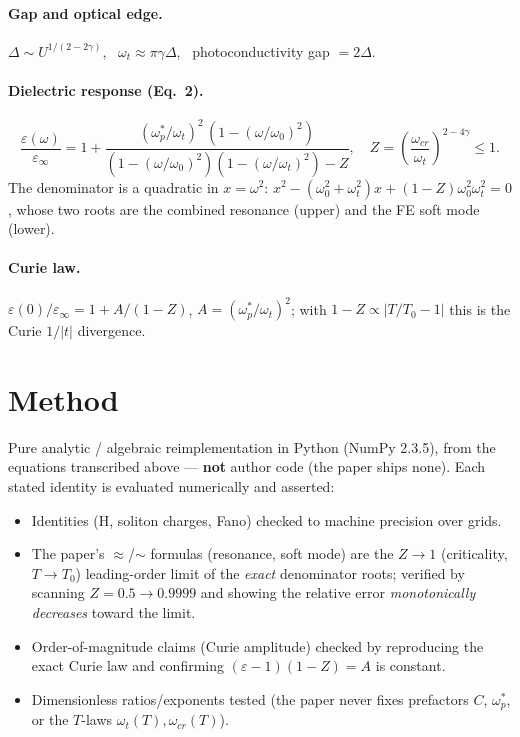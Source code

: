 \documentclass[11pt]{article}
\begin{document}
\paragraph{Gap and optical edge.}
$\Delta\sim U^{1/(2-2\gamma)}$, \ $\omega_t\approx\pi\gamma\Delta$, \ photoconductivity gap $=2\Delta$.
\paragraph{Dielectric response (Eq.~2).}
\begin{equation}
\frac{\varepsilon(\omega)}{\varepsilon_\infty}=1+
\frac{(\omega_p^*/\omega_t)^2\,(1-(\omega/\omega_0)^2)}
{(1-(\omega/\omega_0)^2)(1-(\omega/\omega_t)^2)-Z},\quad
Z=\left(\frac{\omega_{cr}}{\omega_t}\right)^{2-4\gamma}\le1 .
\end{equation}
The denominator is a quadratic in $x=\omega^2$:
$x^2-(\omega_0^2+\omega_t^2)x+(1-Z)\omega_0^2\omega_t^2=0$, whose two roots are the
combined resonance (upper) and the FE soft mode (lower).
\paragraph{Curie law.}
$\varepsilon(0)/\varepsilon_\infty = 1 + A/(1-Z)$, $A=(\omega_p^*/\omega_t)^2$; with
$1-Z\propto|T/T_0-1|$ this is the Curie $1/|t|$ divergence.

\section{Method}
Pure analytic / algebraic reimplementation in Python (NumPy 2.3.5), from the
equations transcribed above --- \textbf{not} author code (the paper ships none).
Each stated identity is evaluated numerically and asserted:
\begin{itemize}
\item Identities (H, soliton charges, Fano) checked to machine precision over grids.
\item The paper's $\approx$/$\sim$ formulas (resonance, soft mode) are the $Z\to1$
      (criticality, $T\to T_0$) leading-order limit of the \emph{exact} denominator
      roots; verified by scanning $Z=0.5\to0.9999$ and showing the relative error
      \emph{monotonically decreases} toward the limit.
\item Order-of-magnitude claims (Curie amplitude) checked by reproducing the exact
      Curie law and confirming $(\varepsilon-1)(1-Z)=A$ is constant.
\item Dimensionless ratios/exponents tested (the paper never fixes prefactors
      $C$, $\omega_p^*$, or the $T$-laws $\omega_t(T),\omega_{cr}(T)$).
\end{itemize}
\end{document}
